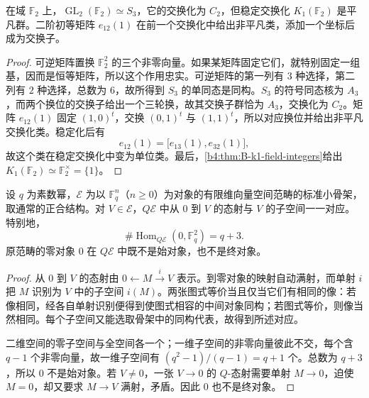 \begin{proposition}\label{b4:prop:B-stabilization-example}
	在域 \(\mathbb F_2\) 上，\(\operatorname{GL}_2(\mathbb F_2)\simeq S_3\)，它的交换化为 \(C_2\)，但稳定交换化 \(K_1(\mathbb F_2)\) 是平凡群。二阶初等矩阵 \(e_{12}(1)\) 在前一个交换化中给出非平凡类，添加一个坐标后成为交换子。
\end{proposition}
\begin{proof}
	可逆矩阵置换 \(\mathbb F_2^2\) 的三个非零向量。如果某矩阵固定它们，就特别固定一组基，因而是恒等矩阵，所以这个作用忠实。可逆矩阵的第一列有 \(3\) 种选择，第二列有 \(2\) 种选择，总数为 \(6\)，故所得到 \(S_3\) 的单同态是同构。\(S_3\) 的符号同态核为 \(A_3\)，而两个换位的交换子给出一个三轮换，故其交换子群恰为 \(A_3\)，交换化为 \(C_2\)。矩阵 \(e_{12}(1)\) 固定 \((1,0)^t\)，交换 \((0,1)^t\) 与 \((1,1)^t\)，所以对应换位并给出非平凡交换化类。稳定化后有
	\[
		e_{12}(1)=\bigl[e_{13}(1),e_{32}(1)\bigr],
	\]
	故这个类在稳定交换化中变为单位类。最后，\cref{b4:thm:B-k1-field-integers}给出 \(K_1(\mathbb F_2)\simeq\mathbb F_2^\times=\{1\}\)。
\end{proof}

\begin{proposition}\label{b4:prop:B-q-zero-subspaces}
	设 \(q\) 为素数幂，\(\mathcal E\) 为以 \(\mathbb F_q^n\)（\(n\ge0\)）为对象的有限维向量空间范畴的标准小骨架，取通常的正合结构。对 \(V\in\mathcal E\)，\(Q\mathcal E\) 中从 \(0\) 到 \(V\) 的态射与 \(V\) 的子空间一一对应。特别地，
	\[
		\#\operatorname{Hom}_{Q\mathcal E}(0,\mathbb F_q^2)=q+3.
	\]
	原范畴的零对象 \(0\) 在 \(Q\mathcal E\) 中既不是始对象，也不是终对象。
\end{proposition}
\begin{proof}
	从 \(0\) 到 \(V\) 的态射由 \(0\leftarrow M\xrightarrow{i}V\) 表示。到零对象的映射自动满射，而单射 \(i\) 把 \(M\) 识别为 \(V\) 中的子空间 \(i(M)\)。两张图式等价当且仅当它们有相同的像：若像相同，经各自单射识别便得到使图式相容的中间对象同构；若图式等价，则像当然相同。每个子空间又能选取骨架中的同构代表，故得到所述对应。

	二维空间的零子空间与全空间各一个；一维子空间的非零向量彼此不交，每个含 \(q-1\) 个非零向量，故一维子空间有 \((q^2-1)/(q-1)=q+1\) 个。总数为 \(q+3\)，所以 \(0\) 不是始对象。若 \(V\ne0\)，一张 \(V\to0\) 的 \(Q\)-态射需要单射 \(M\to0\)，迫使 \(M=0\)，却又要求 \(M\to V\) 满射，矛盾。因此 \(0\) 也不是终对象。
\end{proof}

